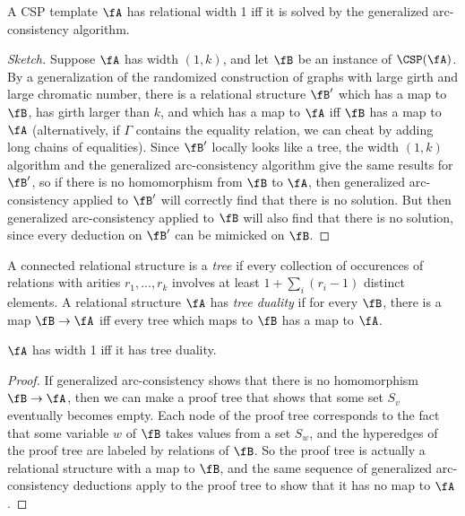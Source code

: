 \begin{thm} A CSP template $\fA$ has relational width 1 iff it is solved by the generalized arc-consistency algorithm.
\end{thm}
\begin{proof}[Sketch] Suppose $\fA$ has width $(1,k)$, and let $\fB$ be an instance of $\CSP(\fA)$. By a generalization of the randomized construction of graphs with large girth and large chromatic number, there is a relational structure $\fB'$ which has a map to $\fB$, has girth larger than $k$, and which has a map to $\fA$ iff $\fB$ has a map to $\fA$ (alternatively, if $\Gamma$ contains the equality relation, we can cheat by adding long chains of equalities). Since $\fB'$ locally looks like a tree, the width $(1,k)$ algorithm and the generalized arc-consistency algorithm give the same results for $\fB'$, so if there is no homomorphism from $\fB$ to $\fA$, then generalized arc-consistency applied to $\fB'$ will correctly find that there is no solution. But then generalized arc-consistency applied to $\fB$ will also find that there is no solution, since every deduction on $\fB'$ can be mimicked on $\fB$.
\end{proof}

\begin{defn} A connected relational structure is a \emph{tree} if every collection of occurences of relations with arities $r_1, ..., r_k$ involves at least $1 + \sum_i (r_i-1)$ distinct elements. A relational structure $\fA$ has \emph{tree duality} if for every $\fB$, there is a map $\fB \rightarrow \fA$ iff every tree which maps to $\fB$ has a map to $\fA$.
\end{defn}

\begin{prop} $\fA$ has width 1 iff it has tree duality.
\end{prop}
\begin{proof} If generalized arc-consistency shows that there is no homomorphism $\fB \rightarrow \fA$, then we can make a proof tree that shows that some set $S_v$ eventually becomes empty. Each node of the proof tree corresponds to the fact that some variable $w$ of $\fB$ takes values from a set $S_w$, and the hyperedges of the proof tree are labeled by relations of $\fB$. So the proof tree is actually a relational structure with a map to $\fB$, and the same sequence of generalized arc-consistency deductions apply to the proof tree to show that it has no map to $\fA$.
\end{proof}

